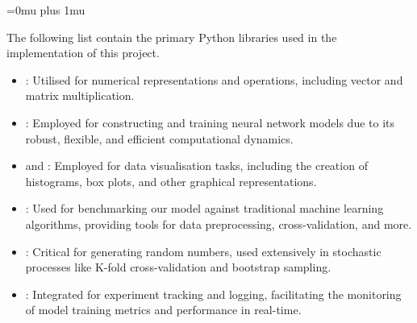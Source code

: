 \documentclass[12pt]{article}
\begin{document}



\newpage



\Urlmuskip=0mu plus 1mu\relax
\printbibliography


The following list contain the primary Python libraries used in the implementation of this project.

\vspace{-6pt}

\begin{itemize}
\setlength\itemsep{-0.3em}
  \item {}: Utilised for numerical representations and operations, including vector and matrix multiplication.
  \item {}: Employed for constructing and training neural network models due to its robust, flexible, and efficient computational dynamics.
  \item {} and : Employed for data visualisation tasks, including the creation of histograms, box plots, and other graphical representations.
  \item {}: Used for benchmarking our model against traditional machine learning algorithms, providing tools for data preprocessing, cross-validation, and more.
  \item {}: Critical for generating random numbers, used extensively in stochastic processes like K-fold cross-validation and bootstrap sampling.
  \item {}: Integrated for experiment tracking and logging, facilitating the monitoring of model training metrics and performance in real-time.
\end{itemize}
\end{document}
